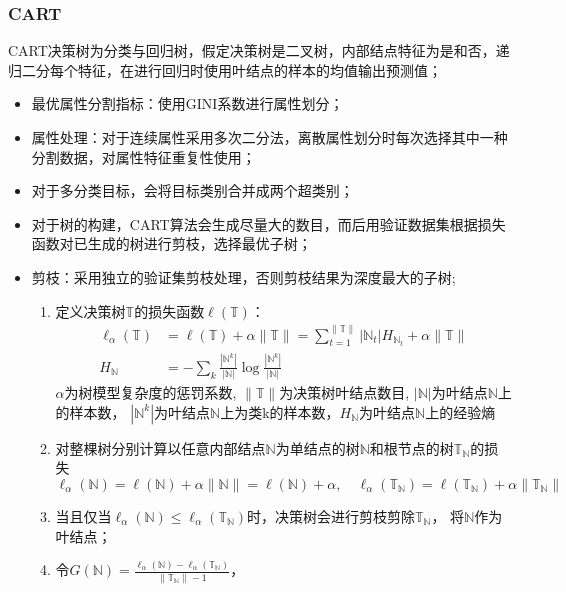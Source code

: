 \documentclass[a4paper]{article}
\begin{document}
		\subsubsection{CART}
		CART决策树为分类与回归树，假定决策树是二叉树，内部结点特征为是和否，递归二分每个特征，在进行回归时使用叶结点的样本的均值输出预测值；
		\begin{itemize}
			\item 	最优属性分割指标：使用GINI系数进行属性划分；
			\item 	属性处理：对于连续属性采用多次二分法，离散属性划分时每次选择其中一种分割数据，对属性特征重复性使用；
			\item 	对于多分类目标，会将目标类别合并成两个超类别；
			\item 	对于树的构建，CART算法会生成尽量大的数目，而后用验证数据集根据损失函数对已生成的树进行剪枝，选择最优子树；
			\item 	剪枝：采用独立的验证集剪枝处理，否则剪枝结果为深度最大的子树;
				\begin{enumerate}
					\item 	定义决策树$\mathbb{T}$的损失函数$\ell(\mathbb{T})$：
						\begin{align*}
							\ell_{\alpha}(\mathbb{T}) 
								& = \ell(\mathbb{T}) + \alpha\|\mathbb{T}\| 
								  = \sum\nolimits_{t=1}^{\|\mathbb{T}\|}|\mathbb{N}_t|H_{\mathbb{N}_t} + \alpha\|\mathbb{T}\|\\
							H_{\mathbb{N}}
								& = -\sum_k\frac{|\mathbb{N}^k|}{|\mathbb{N}|}\log\frac{|\mathbb{N}^k|}{|\mathbb{N}|}
						\end{align*}
						$\alpha$为树模型复杂度的惩罚系数, $\|\mathbb{T}\|$为决策树叶结点数目, $|\mathbb{N}|$为叶结点$\mathbb{N}$上的样本数，
						$|\mathbb{N}^k|$为叶结点$\mathbb{N}$上为类k的样本数，$H_{\mathbb{N}}$为叶结点$\mathbb{N}$上的经验熵
					\item 	对整棵树分别计算以任意内部结点$\mathbb{N}$为单结点的树$\mathbb{N}$和根节点的树$\mathbb{T}_{\mathbb{N}}$的损失
						$$\ell_\alpha(\mathbb{N}) = \ell(\mathbb{N})+\alpha\|{\mathbb{N}}\| = \ell(\mathbb{N})+\alpha,
						\quad \ell_\alpha(\mathbb{T}_{\mathbb{N}}) = \ell(\mathbb{T}_{\mathbb{N}})+\alpha\|\mathbb{T}_{\mathbb{N}}\|$$
					\item 	当且仅当$\ell_\alpha(\mathbb{N})\leq \ell_\alpha(\mathbb{T}_{\mathbb{N}})$时，决策树会进行剪枝剪除$\mathbb{T}_{\mathbb{N}}$，
						将$\mathbb{N}$作为叶结点；
					\item 	令$G(\mathbb{N}) = \frac{\ell_\alpha(\mathbb{N})-\ell_\alpha(\mathbb{T}_{\mathbb{N}})}{\|\mathbb{T}_{\mathbb{N}}\|-1}$，

\end{enumerate}
\end{itemize}
\end{document}
